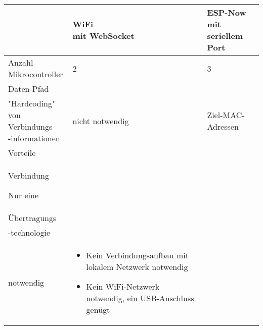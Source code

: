 \newpage
\newpage

\begin{table}[t]
    \centering
    \begin{tabular}{|m{2.6cm}|m{4cm}|m{4cm}|}
        \hline
        ~                                                     & \parbox[c][1cm]{4cm}{WiFi         \\mit WebSocket} & \parbox[c][1cm]{4cm}{ESP-Now\\mit seriellem Port} \\ \hline
        \parbox[c][1cm]{2.6cm}{Anzahl                                                             \\Mikrocontroller} & 2                                                     & 3 \\ \hline
        \parbox[c][3cm]{2.6cm}{Daten-Pfad}                    & \parbox[c]{3cm}{}                            & \parbox[c]{3cm}{}   \\ \hline
        \parbox[c][1.5cm]{2.6cm}{"Hardcoding"                                                     \\von Verbindungs\\-informationen} & nicht notwendig & Ziel-MAC-Adressen \\ \hline
        \parbox[c][3.5cm]{2.6cm}{Vorteile}
                                                              &
        \parbox[c][3.5cm]{4cm}{
        \begin{itemize}
                \item Stabilere\\Verbindung
                \item Nur eine\\Übertragungs\\-technologie\\notwendig
            \end{itemize}} &
        \parbox[c][3.5cm]{4cm}{
        \begin{itemize}
                \item Kein Verbindungsaufbau mit lokalem Netzwerk notwendig
                \item Kein WiFi-Netzwerk notwendig, ein USB-Anschluss genügt
            \end{itemize}}                               \\ \hline
    \end{tabular}
\end{table}